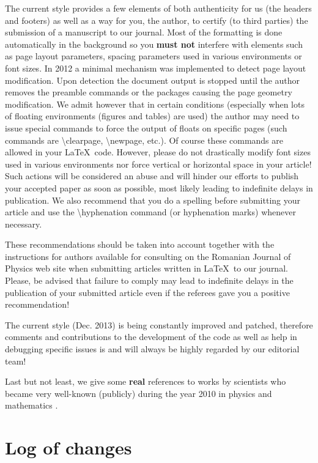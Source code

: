 \documentclass[myclassdoc,debug]{rjparticle}
\begin{document}
The current style provides a few elements of both authenticity for us (the headers and footers) as well as a way for you, the author, to certify (to third parties) the submission of a manuscript to our journal. Most of the formatting is done automatically in the background so you \textbf{must not} interfere with elements such as page layout parameters, spacing parameters used in various environments or font sizes. In 2012 a minimal mechanism was implemented to detect page layout modification. Upon detection the document output is stopped until the author removes the preamble commands or the packages causing the page geometry modification. We admit however that in certain conditions (especially when lots of floating environments (figures and tables) are used) the author may need to issue special commands to force the output of floats on specific pages (such commands are \textbackslash clearpage, \textbackslash newpage, etc.). Of course these commands are allowed in your \LaTeX ~code. However, please do not 
drastically modify font sizes used in various environments nor force vertical or horizontal space in your article! Such actions will be considered an abuse and will hinder our efforts to publish your accepted paper as soon as possible, most likely leading to indefinite delays in publication. We also recommend that you do a spelling before submitting your article and use the \textbackslash hyphenation command (or hyphenation marks) whenever necessary.

These recommendations should be taken into account together with the instructions for authors available for consulting on the Romanian Journal of Physics web site when submitting articles written in \LaTeX ~to our journal. Please, be advised that failure to comply may lead to indefinite delays in the publication of your submitted article even if the referees gave you a positive recommendation!

The current style (Dec. 2013) is being constantly improved and patched, therefore comments and contributions to the development of the code as well as help in debugging specific issues is and will always be highly regarded by our editorial team!

Last but not least, we give some \textbf{real} references to works by scientists who became very well-known (publicly) during the year 2010 in physics \cite{nobelphys1, nobelphys2, nobelphys3} and mathematics \cite{fields1,fields2,fields3}.

\section{Log of changes}
\end{document}
